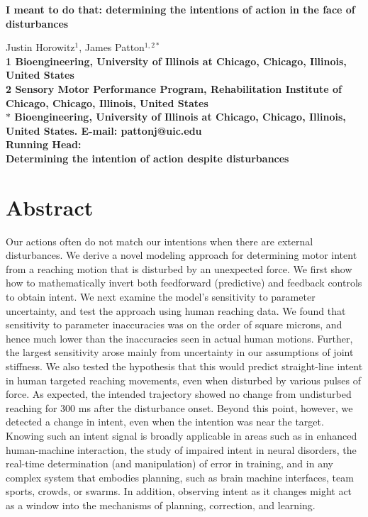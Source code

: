 \documentclass[10pt]{article}
\date{}
\begin{document}
\begin{titlepage}
\begin{center}
{\Large
\textbf{I meant to do that: determining the intentions of action in the face of disturbances}
}\\[1cm]
\end{center}

\begin{flushleft}
Justin Horowitz$^{1}$, 
James Patton$^{1,2\ast}$
\\
\bf{1} Bioengineering, University of Illinois at Chicago, Chicago, Illinois, United States
\\
\bf{2} Sensory Motor Performance Program, Rehabilitation Institute of Chicago, Chicago, Illinois, United States
\\
$\ast$ Bioengineering, University of Illinois at Chicago, Chicago, Illinois, United States. E-mail: pattonj@uic.edu
\\[1cm]
Running Head: \\
Determining the intention of action despite disturbances
\end{flushleft}
\end{titlepage}

\section*{Abstract}
Our actions often do not match our intentions when there are external disturbances. We derive a novel modeling approach for determining motor intent from a reaching motion that is disturbed by an unexpected force. We first show how to mathematically invert both feedforward (predictive) and feedback controls to obtain intent. We next examine the model’s sensitivity to parameter uncertainty, and test the approach using human reaching data. We found that sensitivity to parameter inaccuracies was on the order of square microns, and hence much lower than the inaccuracies seen in actual human motions. Further, the largest sensitivity arose mainly from uncertainty in our assumptions of joint stiffness. We also tested the hypothesis that this would predict straight-line intent in human targeted reaching movements, even when disturbed by various pulses of force. As expected, the intended trajectory showed no change from undisturbed reaching for 300 ms after the disturbance onset. Beyond this point, however, we detected a change in intent, even when the intention was near the target.  Knowing such an intent signal is broadly applicable in areas such as in enhanced human-machine interaction, the study of impaired intent in neural disorders, the real-time determination (and manipulation) of error in training, and in any complex system that embodies planning, such as brain machine interfaces, team sports, crowds, or swarms. In addition, observing intent as it changes might act as a window into the mechanisms of planning, correction, and learning.
\end{document}
